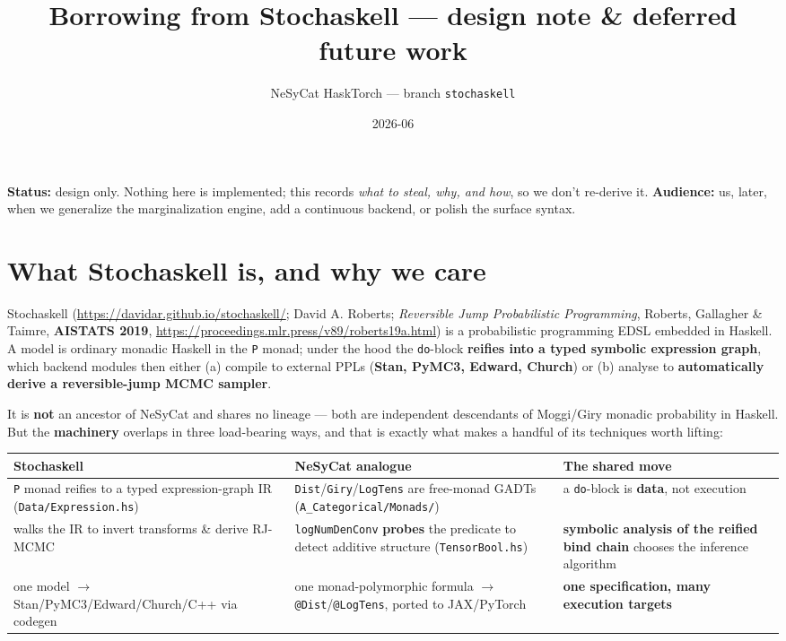 \documentclass[11pt]{article}
\title{Borrowing from Stochaskell --- design note \& deferred future work}
\author{NeSyCat HaskTorch --- branch \texttt{stochaskell}}
\date{2026-06}
\newcommand{\code}[1]{\texttt{#1}}
\begin{document}
\maketitle

\noindent\textbf{Status:} design only. Nothing here is implemented; this records \emph{what to
steal, why, and how}, so we don't re-derive it. \textbf{Audience:} us, later, when we generalize the
marginalization engine, add a continuous backend, or polish the surface syntax.

\section*{What Stochaskell is, and why we care}

Stochaskell (\url{https://davidar.github.io/stochaskell/}; David A. Roberts; \emph{Reversible Jump
Probabilistic Programming}, Roberts, Gallagher \& Taimre, \textbf{AISTATS 2019},
\url{https://proceedings.mlr.press/v89/roberts19a.html}) is a probabilistic programming EDSL embedded
in Haskell. A model is ordinary monadic Haskell in the \code{P} monad; under the hood the \code{do}-block
\textbf{reifies into a typed symbolic expression graph}, which backend modules then either (a) compile
to external PPLs (\textbf{Stan, PyMC3, Edward, Church}) or (b) analyse to \textbf{automatically derive
a reversible-jump MCMC sampler}.

It is \textbf{not} an ancestor of NeSyCat and shares no lineage --- both are independent descendants of
Moggi/Giry monadic probability in Haskell. But the \textbf{machinery} overlaps in three load-bearing
ways, and that is exactly what makes a handful of its techniques worth lifting:

\begin{center}
\begin{tabular}{@{}p{}p{}p{}@{}}
\toprule
Stochaskell & NeSyCat analogue & The shared move \\
\midrule
\code{P} monad reifies to a typed expression-graph IR (\code{Data/Expression.hs}) &
\code{Dist}/\code{Giry}/\code{LogTens} are free-monad GADTs (\code{A\_Categorical/Monads/}) &
a \code{do}-block is \textbf{data}, not execution \\
walks the IR to invert transforms \& derive RJ-MCMC &
\code{logNumDenConv} \textbf{probes} the predicate to detect additive structure (\code{TensorBool.hs}) &
\textbf{symbolic analysis of the reified bind chain} chooses the inference algorithm \\
one model $\to$ Stan/PyMC3/Edward/Church/C++ via codegen &
one monad-polymorphic formula $\to$ \code{@Dist}/\code{@LogTens}, ported to JAX/PyTorch &
\textbf{one specification, many execution targets} \\
\bottomrule
\end{tabular}
\end{center}
\end{document}
